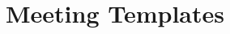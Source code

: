 \documentclass{article}
\begin{document}
\newpage


\newpage


\newpage


\newpage



\newpage
\section{Meeting Templates}

\newpage

\newpage

\end{document}
